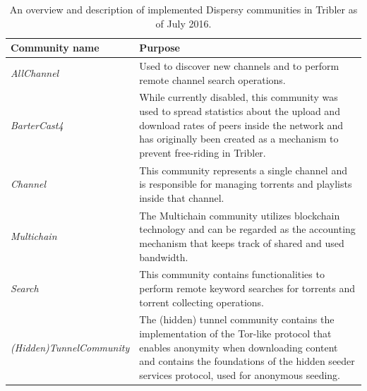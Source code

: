 \begin{table}
	\begin{tabularx}{\textwidth}{|l|X|}
		\hline
		\textbf{Community name} & \textbf{Purpose} \\ \hline
		\emph{AllChannel} & Used to discover new channels and to perform remote channel search operations.\\ \hline
		\emph{BarterCast4} & While currently disabled, this community was used to spread statistics about the upload and download rates of peers inside the network and has originally been created as a mechanism to prevent free-riding in Tribler\cite{meulpolder2009bartercast}.\\ \hline
		\emph{Channel} & This community represents a single channel and is responsible for managing torrents and playlists inside that channel.\\ \hline
		\emph{Multichain} & The Multichain community utilizes blockchain technology and can be regarded as the accounting mechanism that keeps track of shared and used bandwidth.\\ \hline
		\emph{Search} & This community contains functionalities to perform remote keyword searches for torrents and torrent collecting operations.\\ \hline
		\emph{(Hidden)TunnelCommunity} & The (hidden) tunnel community contains the implementation of the Tor-like protocol that enables anonymity when downloading content and contains the foundations of the hidden seeder services protocol, used for anonymous seeding.\\ \hline
	\end{tabularx}
	\caption{An overview and description of implemented Dispersy communities in Tribler as of July 2016.}
	\label{table:dispersy-communities}
\end{table}

